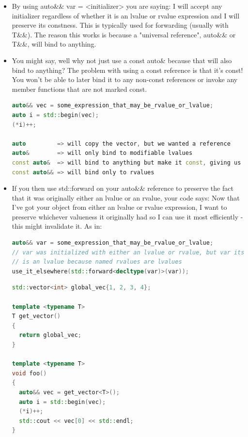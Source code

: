 \documentclass[a4paper,12pt,twoside]{book}
\begin{document}
\begin{itemize}
\item By using auto\&\& var = <initializer> you are saying: I will accept any initializer regardless of whether it is an lvalue or rvalue expression and I will preserve its constness. This is typically used for forwarding (usually with T\&\&). The reason this works is because a "universal reference", auto\&\& or T\&\&, will bind to anything.

\item You might say, well why not just use a const auto\& because that will also bind to anything? The problem with using a const reference is that it's const! You won't be able to later bind it to any non-const references or invoke any member functions that are not marked const.
\begin{lstlisting}[frame=single, language=c++]
auto&& vec = some_expression_that_may_be_rvalue_or_lvalue;
auto i = std::begin(vec);
(*i)++;

auto         => will copy the vector, but we wanted a reference
auto&        => will only bind to modifiable lvalues
const auto&  => will bind to anything but make it const, giving us const_iterator
const auto&& => will bind only to rvalues
\end{lstlisting}

\item If you then use std::forward on your auto\&\& reference to preserve the fact that it was originally either an lvalue or an rvalue, your code says: Now that I've got your object from either an lvalue or rvalue expression, I want to preserve whichever valueness it originally had so I can use it most efficiently - this might invalidate it. As in:
\begin{lstlisting}[frame=single, language=c++]
auto&& var = some_expression_that_may_be_rvalue_or_lvalue;
// var was initialized with either an lvalue or rvalue, but var itself
// is an lvalue because named rvalues are lvalues
use_it_elsewhere(std::forward<decltype(var)>(var));
\end{lstlisting}


\begin{lstlisting}[frame=single, language=c++]
std::vector<int> global_vec{1, 2, 3, 4};

template <typename T>
T get_vector()
{
  return global_vec;
}

template <typename T>
void foo()
{
  auto&& vec = get_vector<T>();
  auto i = std::begin(vec);
  (*i)++;
  std::cout << vec[0] << std::endl;
}
\end{lstlisting}


\end{itemize}
\end{document}
